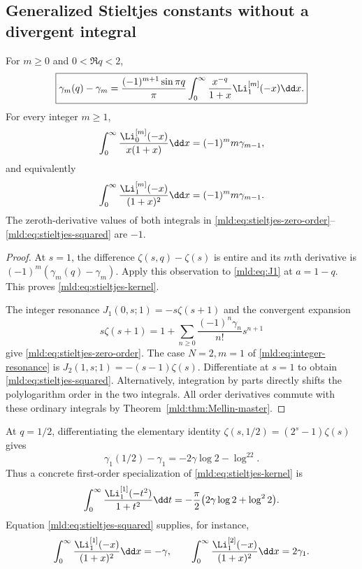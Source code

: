 \subsection{Generalized Stieltjes constants without a divergent integral}

\begin{theorem}\label{mld:thm:stieltjes-kernel}
For $m\ge0$ and $0<\Re q<2$,
\begin{equation}\label{mld:eq:stieltjes-kernel}
 \boxed{\displaystyle
 \gamma_m(q)-\gamma_m
 =\frac{(-1)^{m+1}\sin\pi q}{\pi}
       \int_0^\infty\frac{x^{-q}}{1+x}\Li_1^{[m]}(-x)\dd x.}
\end{equation}
For every integer $m\ge1$,
\begin{equation}\label{mld:eq:stieltjes-zero-order}
 \int_0^\infty\frac{\Li_0^{[m]}(-x)}{x(1+x)}\dd x
       =(-1)^m m\gamma_{m-1},
\end{equation}
and equivalently
\begin{equation}\label{mld:eq:stieltjes-squared}
 \int_0^\infty\frac{\Li_1^{[m]}(-x)}{(1+x)^2}\dd x
       =(-1)^m m\gamma_{m-1}.
\end{equation}
The zeroth-derivative values of both integrals in
\eqref{mld:eq:stieltjes-zero-order}--\eqref{mld:eq:stieltjes-squared} are $-1$.
\end{theorem}

\begin{proof}
At $s=1$, the difference $\zeta(s,q)-\zeta(s)$ is entire and its $m$th derivative is $(-1)^m(\gamma_m(q)-\gamma_m)$. Apply this observation to \eqref{mld:eq:J1} at $a=1-q$. This proves \eqref{mld:eq:stieltjes-kernel}.

The integer resonance $J_1(0,s;1)=-s\zeta(s+1)$ and the convergent expansion
\begin{equation}\label{mld:eq:F-stieltjes}
 s\zeta(s+1)=1+
       \sum_{n\ge0}\frac{(-1)^n\gamma_n}{n!}s^{n+1}
\end{equation}
give \eqref{mld:eq:stieltjes-zero-order}. The case $N=2,m=1$ of
\eqref{mld:eq:integer-resonance} is $J_2(1,s;1)=-(s-1)\zeta(s)$.
Differentiate at $s=1$ to obtain \eqref{mld:eq:stieltjes-squared}. Alternatively, integration by parts directly shifts the polylogarithm order in the two integrals. All order derivatives commute with these ordinary integrals by Theorem~\ref{mld:thm:Mellin-master}.
\end{proof}

At $q=1/2$, differentiating the elementary identity
$\zeta(s,1/2)=(2^s-1)\zeta(s)$ gives
\[
 \gamma_1(1/2)-\gamma_1=-2\gamma\log2-\log^22.
\]
Thus a concrete first-order specialization of
\eqref{mld:eq:stieltjes-kernel} is
\begin{equation}\label{mld:eq:stieltjes-half-integral}
 \int_0^\infty\frac{\Li_1^{[1]}(-t^2)}{1+t^2}\dd t
       =-\frac\pi2\big(2\gamma\log2+\log^22\big).
\end{equation}
Equation \eqref{mld:eq:stieltjes-squared} supplies, for instance,
\[
 \int_0^\infty\frac{\Li_1^{[1]}(-x)}{(1+x)^2}\dd x=-\gamma,
 \qquad
 \int_0^\infty\frac{\Li_1^{[2]}(-x)}{(1+x)^2}\dd x=2\gamma_1.
\]

